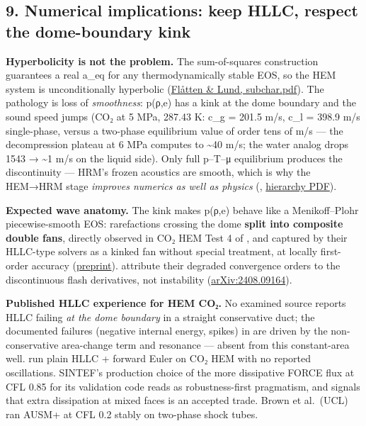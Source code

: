\hypertarget{numerical-implications-keep-hllc-respect-the-dome-boundary-kink}{%
\subsection{9. Numerical implications: keep HLLC, respect the
dome-boundary
kink}\label{numerical-implications-keep-hllc-respect-the-dome-boundary-kink}}

\textbf{Hyperbolicity is not the problem.} The sum-of-squares
construction guarantees a real a\_eq for any thermodynamically stable
EOS, so the HEM system is unconditionally hyperbolic
(\href{https://www.sintef.no/globalassets/project/co2-dynamics/publications/subchar.pdf}{Flåtten
\& Lund, subchar.pdf}). The pathology is loss of \emph{smoothness}:
p(ρ,e) has a kink at the dome boundary and the sound speed jumps (CO₂ at
5 MPa, 287.43 K: c\_g = 201.5 m/s, c\_l = 398.9 m/s single-phase, versus
a two-phase equilibrium value of order tens of m/s --- the decompression
plateau at 6 MPa computes to \textasciitilde40 m/s; the water analog
drops 1543 → \textasciitilde1 m/s on the liquid side). Only full p--T--μ
equilibrium produces the discontinuity --- HRM's frozen acoustics are
smooth, which is why the HEM→HRM stage \emph{improves numerics as well as physics} (\citealp{lund2012}, \href{https://www.sintef.no/globalassets/project/co2-dynamics/publications/lund_two-phase_relaxation_hierarchy.pdf}{hierarchy PDF}).

\textbf{Expected wave anatomy.} The kink makes p(ρ,e) behave like a
Menikoff--Plohr piecewise-smooth EOS: rarefactions crossing the dome
\textbf{split into composite double fans}, directly observed in CO₂ HEM Test 4 of \citet{log2021}, and captured by their HLLC-type solvers as a kinked fan
without special treatment, at locally first-order accuracy
(\href{https://www.pvv.ntnu.no/~stm/dring/hllcs-hem.pdf}{preprint}).
\citet{kumar2024} attribute their degraded convergence orders to the
discontinuous flash derivatives, not instability
(\href{https://arxiv.org/html/2408.09164v2}{arXiv:2408.09164}).

\textbf{Published HLLC experience for HEM CO₂.} No examined source
reports HLLC failing \emph{at the dome boundary} in a straight
conservative duct; the documented failures (negative internal energy,
spikes) in \citet{log2021} are driven by the non-conservative area-change
term and resonance --- absent from this constant-area well. \citet{kumar2024} run plain HLLC + forward Euler on CO₂ HEM with no reported
oscillations. SINTEF's production choice of the more dissipative FORCE
flux at CFL 0.85 for its validation code reads as robustness-first
pragmatism, and signals that extra dissipation at mixed faces is an
accepted trade. Brown et al.~(UCL) ran AUSM+ at CFL 0.2 stably on
two-phase shock tubes.

